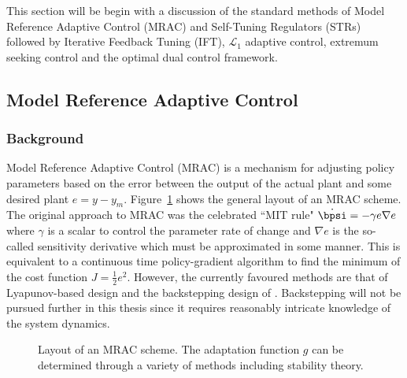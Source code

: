 This section will be begin with a discussion of the standard methods of Model Reference Adaptive Control (MRAC) and Self-Tuning Regulators (STRs) followed by Iterative Feedback Tuning (IFT), $\mathcal{L}_1$ adaptive control, extremum seeking control and the optimal dual control framework.

\subsection{Model Reference Adaptive Control}
\subsubsection{Background}
Model Reference Adaptive Control (MRAC) is a mechanism for adjusting policy parameters based on the error between the output of the actual plant and some desired plant $e = y - y_m$. Figure~\ref{figs:MRAC} shows the general layout of an MRAC scheme. The original approach to MRAC was the celebrated ``MIT rule" $\dot\bpsi = - \gamma e \nabla e$ where $\gamma$ is a scalar to control the parameter rate of change and $\nabla e$ is the so-called sensitivity derivative which must be approximated in some manner. This is equivalent to a continuous time policy-gradient algorithm to find the minimum of the cost function $J = \frac{1}{2}e^2$. However, the currently favoured methods are that of Lyapunov-based design and the backstepping design of \cite{KKK95}. Backstepping will not be pursued further in this thesis since it requires reasonably intricate knowledge of the system dynamics. 

\begin{figure}
\centering

\caption{Layout of an MRAC scheme. The adaptation function $g$ can be determined through a variety of methods including stability theory.}
\label{figs:MRAC}
\end{figure}

